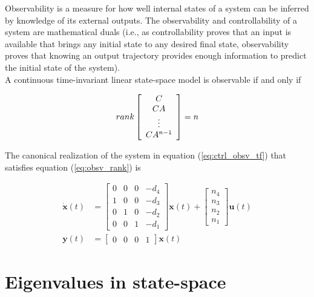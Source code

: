 \documentclass[10pt,conference,compsoc]{IEEEtran}
\newcommand{\mtx}[1] {\bm #1}
\begin{document}
Observability is a measure for how well internal \glspl{state} of a \gls{system}
can be inferred by knowledge of its external outputs. The observability and
controllability of a \gls{system} are mathematical duals (i.e., as
controllability proves that an input is available that brings any initial
\gls{state} to any desired final \gls{state}, observability proves that knowing
an output trajectory provides enough information to predict the initial
\gls{state} of the \gls{system}). \\

A continuous \gls{time-invariant} linear state-space model is observable if and
only if

\begin{equation} \label{eq:obsv_rank}
  rank \left[
  \begin{array}{c}
    C \\
    CA \\
    \vdots \\
    CA^{n-1}
  \end{array}
  \right] = n \\
\end{equation}

The canonical realization of the \gls{system} in equation
(\ref{eq:ctrl_obsv_tf}) that satisfies equation (\ref{eq:obsv_rank}) is

\begin{align}
  \dot{\mtx{x}}(t) &= \left[
  \begin{array}{cccc}
    0 & 0 & 0 & -d_4 \\
    1 & 0 & 0 & -d_3 \\
    0 & 1 & 0 & -d_2 \\
    0 & 0 & 1 & -d_1
  \end{array}
  \right] \mtx{x}(t) + \left[
  \begin{array}{c}
    n_4 \\
    n_3 \\
    n_2 \\
    n_1
  \end{array}
  \right] \mtx{u}(t) \\
  \mtx{y}(t) &= \left[
  \begin{array}{cccc}
    0 & 0 & 0 & 1
  \end{array}
  \right] \mtx{x}(t)
\end{align}

\section{Eigenvalues in state-space}
\end{document}
